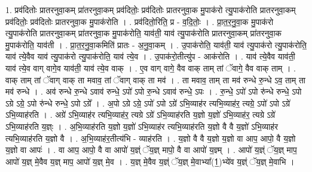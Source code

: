\documentclass[17pt]{extarticle}
\begin{document}
1. प्रव॑दितोः प्रातरनुवा॒कम् प्रा॑तरनुवा॒कम् प्रव॑दितोः॒ प्रव॑दितोः प्रातरनुवा॒क मु॒पाक॑रो त्यु॒पाक॑रोति प्रातरनुवा॒कम् प्रव॑दितोः॒ प्रव॑दितोः प्रातरनुवा॒क मु॒पाक॑रोति । . प्रव॑दितो॒रिति॒ प्र - व॒दि॒तोः॒ । . प्रा॒त॒र॒नु॒वा॒क मु॒पाक॑रो त्यु॒पाक॑रोति प्रातरनुवा॒कम् प्रा॑तरनुवा॒क मु॒पाक॑रोति॒ याव॑ती॒ याव॑
त्यु॒पाक॑रोति प्रातरनुवा॒कम् प्रा॑तरनुवा॒क मु॒पाक॑रोति॒ याव॑ती । . प्रा॒त॒र॒नु॒वा॒कमिति॑ प्रातः - अ॒नु॒वा॒कम् । . उ॒पाक॑रोति॒ याव॑ती॒ याव॑ त्यु॒पाक॑रो त्यु॒पाक॑रोति॒ याव॑ त्ये॒वैव याव॑ त्यु॒पाक॑रो त्यु॒पाक॑रोति॒ याव॑ त्ये॒व । . उ॒पाक॑रो॒तीत्यु॑प - आक॑रोति । . याव॑ त्ये॒वैव याव॑ती॒ याव॑ त्ये॒व वाग् वागे॒व याव॑ती॒ याव॑ त्ये॒व वाक् । . ए॒व वाग् वागे॒ वैव वाक् ताम् तां ॅवागे॒ वैव वाक् ताम् । . वाक् ताम् तां ॅवाग् वाक् ता मवाव॒ तां ॅवाग् वाक् ता मव॑ । . ता मवाव॒ ताम् ता मव॑ रुन्धे रु॒न्धे ऽव॒ ताम् ता मव॑ रुन्धे । . अव॑ रुन्धे रु॒न्धे ऽवाव॑ रुन्धे॒ ऽपो॑ ऽपो रु॒न्धे ऽवाव॑ रुन्धे॒ ऽपः । . रु॒न्धे॒ ऽपो॑ ऽपो रु॑न्धे रुन्धे॒ ऽपो ऽग्रे ऽग्रे॒ ऽपो रु॑न्धे रुन्धे॒ ऽपो ऽग्रे᳚ । . अ॒पो ऽग्रे ऽग्रे॒ ऽपो॑ ऽपो ऽग्रे॑ ऽभि॒व्याह॑र त्यभि॒व्याह॑र॒ त्यग्रे॒ ऽपो॑ ऽपो ऽग्रे॑ ऽभि॒व्याह॑रति । . अग्रे॑ ऽभि॒व्याह॑र त्यभि॒व्याह॑र॒ त्यग्रे ऽग्रे॑ ऽभि॒व्याह॑रति य॒ज्ञो य॒ज्ञो॑ ऽभि॒व्याह॑र॒ त्यग्रे ऽग्रे॑ ऽभि॒व्याह॑रति य॒ज्ञ्ः । . अ॒भि॒व्याह॑रति य॒ज्ञो य॒ज्ञो॑ ऽभि॒व्याह॑र त्यभि॒व्याह॑रति य॒ज्ञो वै वै य॒ज्ञो॑ ऽभि॒व्याह॑र त्यभि॒व्याह॑रति य॒ज्ञो वै । . अ॒भि॒व्याह॑र॒तीत्य॑भि - व्याह॑रति । . य॒ज्ञो वै वै य॒ज्ञो य॒ज्ञो वा आप॒ आपो॒ वै य॒ज्ञो य॒ज्ञो वा आपः॑ । . वा आप॒ आपो॒ वै वा आपो॑ य॒ज्ञ्ं ॅय॒ज्ञ् मापो॒ वै वा आपो॑ य॒ज्ञ्म् । . आपो॑ य॒ज्ञ्ं ॅय॒ज्ञ् माप॒ आपो॑ य॒ज्ञ् मे॒वैव य॒ज्ञ् माप॒ आपो॑ य॒ज्ञ् मे॒व । . य॒ज्ञ् मे॒वैव य॒ज्ञ्ं ॅय॒ज्ञ् मे॒वाभ्या᳚(1॒)भ्ये॑व य॒ज्ञ्ं ॅय॒ज्ञ् मे॒वाभि । \newline
\end{document}
